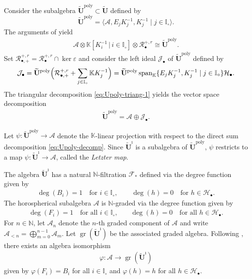 \documentclass[a4paper,reqno,12pt]{amsart}
\numberwithin{equation}{section}
\theoremstyle{definition}
\theoremstyle{plain}
\theoremstyle{definition}
\def\K{\mathbb K}
\def\N{\mathbb N}
\def\I{\mathbb I}
\def\wI{\I_\circ}
\def\tU{\widetilde{\mathbf U}}
\def\tUi{\widetilde{\mathbf U}^{\imath}}
\def\cA{\mathcal A}
\def\cF{\mathcal F}
\def\cR{\mathcal R}
\def\cH{\mathcal H}
\def\cJ{\mathcal J}
\newcommand{\Span}{\operatorname{span}}
\newcommand{\eps}{\varepsilon}
\newcommand{\poly}{\mathrm{poly}}
\newcommand{\gr}{\operatorname{gr}}
\begin{document}
Consider the subalgebra $\tU^{\text{poly}}\subset \tU$ defined by
\begin{equation*}
    \tU^{\text{poly}}=\langle\cA,E_jK_j^{-1},K_j^{-1}\mid j\in\wI\rangle.
\end{equation*}
The arguments of \cite[\S 2.5]{KY26} yield
\begin{align}
    \label{eq:Upoly-triang-1}
    \cA\otimes \K[K_i^{-1}\,|\,i\in \I_\circ]\otimes \cR_{\bullet}^{+,r}\cong \tU^\poly.
\end{align}
Set $\cR_{\bullet,+}^{+,r}=\cR_\bullet^{+,r}\cap\ker\eps$ and consider the left ideal $\cJ_\bullet$ of $\tU^\poly$ defined by
\begin{equation}\label{eq:J-triang}
   \cJ_\bullet=\tU^\poly\Bigl(\cR_{\bullet,+}^{+,r}
+\sum_{j\in\wI}\K K_j^{-1}\Bigr)= \tU^\poly\Span_\K\{E_jK_j^{-1},K_j^{-1}\mid j\in\wI\}\cH_\bullet.
\end{equation}
The triangular decomposition \eqref{eq:Upoly-triang-1} yields the vector space decomposition
  \begin{align}\label{eq:Upoly-decomp}
     \tU^\poly = \cA\oplus \cJ_{\bullet}.
  \end{align}

Let $\psi:\tU^\poly\rightarrow \cA$ denote the $\K$-linear projection with respect to the direct sum decomposition \eqref{eq:Upoly-decomp}. Since $\tUi$ is a subalgebra of $\tU^{\text{poly}}$, $\psi$ restricts to a map $\psi:\tUi\rightarrow \cA$, called the \textit{Letzter map}.

The algebra $\tUi$ has a natural $\N$-filtration $\cF_\ast$ defined via the degree function given by 
\begin{equation}
\begin{aligned}\label{eq:filt-def}
  \deg(B_i)=1 \quad \mbox{for $i\in \wI$},\qquad
  \deg(h)=0 \quad \mbox{for $h\in \cH_\bullet$.}
\end{aligned}
\end{equation}
The horospherical subalgebra $\cA$ is $\N$-graded via the degree function given by
  \begin{align*}
     \deg(F_i)=1 \quad \mbox{for all $i\in \wI$,}\qquad
     \deg(h)=0 \quad \mbox{for all $h\in \cH_\bullet$}.
  \end{align*}
For $n\in \N$, let $\cA_n$ denote the $n$-th graded component of $\cA$ and write $\cA_{<n}=\bigoplus_{m=0}^{n-1}\cA_m$.
Let $\gr(\tUi)$ be the associated graded algebra. Following \cite[Lemma 2.7]{KY26}, there exists an algebra isomorphism
\begin{align}\label{eq:varphi}
  \varphi:\cA \rightarrow \gr(\tUi)
\end{align}
given by $\varphi(F_i)=B_{i}$ for all $i\in \wI$ and $\varphi(h)=h$ for all $h\in \cH_\bullet$.
\end{document}
